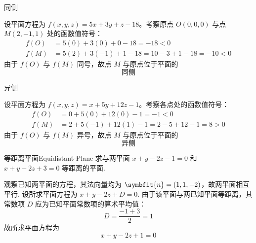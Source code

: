 \begin{solution}
     同侧

    设平面方程为 $f(x, y, z) = 5x + 3y + z - 18$。考察原点 $O(0, 0, 0)$ 与点 $M(2, -1, 1)$ 处的函数值符号：
    \begin{equation*}
        \begin{aligned}
            f(O) & = 5(0) + 3(0) + 0 - 18 = -18 < 0                    \\
            f(M) & = 5(2) + 3(-1) + 1 - 18 = 10 - 3 + 1 - 18 = -10 < 0
        \end{aligned}
    \end{equation*}
    由于 $f(O)$ 与 $f(M)$ 同号，故点 $M$ 与原点位于平面的
    \begin{equation*}
        \boxed{\text{同侧}}
    \end{equation*}

     异侧

    设平面方程为 $f(x, y, z) = x + 5y + 12z - 1$。考察各点处的函数值符号：
    \begin{equation*}
        \begin{aligned}
            f(O) & = 0 + 5(0) + 12(0) - 1 = -1 < 0                  \\
            f(M) & = 2 + 5(-1) + 12(1) - 1 = 2 - 5 + 12 - 1 = 8 > 0
        \end{aligned}
    \end{equation*}
    由于 $f(O)$ 与 $f(M)$ 异号，故点 $M$ 与原点位于平面的
    \begin{equation*}
        \boxed{\text{异侧}}
    \end{equation*}
\end{solution}


\begin{problem}{等距离平面}{Equidistant-Plane}
    求与两平面 $x + y - 2z - 1 = 0$ 和 $x + y - 2z + 3 = 0$ 等距离的平面.
\end{problem}

\begin{solution}
    观察已知两平面的方程，其法向量均为 $\symbfit{n} = (1, 1, -2)$，故两平面相互平行.
    设所求平面方程为 $x + y - 2z + D = 0$.
    由于该平面与两已知平面等距离，其常数项 $D$ 应为已知平面常数项的算术平均值：
    \begin{equation*}
        D = \frac{-1 + 3}{2} = 1
    \end{equation*}
    故所求平面方程为
    \begin{equation*}
        \boxed{x + y - 2z + 1 = 0}
    \end{equation*}
\end{solution}

